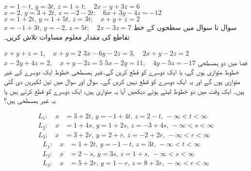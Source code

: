 $x=1-t,\,y=3t,\,z=1+t;\quad 2x-y+3z=6$
$x=2,\,y=3+2t,\,z=-2-2t;\quad 6x+3y-4z=-12$
$x=1+2t,\, y=1+5t,\,z=3t;\quad x+y+z=2$
$x=-1+3t,\,y=-2,\,z=5t;\quad 2x-3z=7$
سوال  تا سوال  میں سطحوں کے خط تقاطع کی مقدار معلوم مساوات تلاش کریں۔

$x+y+z=1,\quad x+y=2$
$3x-6y-2z=3,\quad 2x+y-2z=2$
$x-2y+4z=2,\quad x+y-2z=5$
$5x-2y=11,\quad 4y-5z=-17$
فضا میں  دو ہمسطحی   خطوط متوازی ہوں گے،  یا  ایک دوسرے کو قطع کریں گے۔غیر ہمسطحی خطوط ایک دوسرے کے غیر متوازی ہوں گے اور یہ ایک دوسرے کو قطع نہیں کریں گے۔ سوال  اور سوال  میں تین لکیریں  دی گئی ہیں۔  ایک وقت میں دو خطوط  لیتے ہوئے دیکھیں آیا یہ متوازی ہیں،   ایک دوسرے کو قطع کرتے ہیں یا یہ غیر ہمسطحی ہیں؟

\begin{align*}
L_1:\quad x&=3+2t,\,y=-1+4t,\,z=2-t,\,-\infty<t<\infty\\
L_2:\quad x&=1+4s,\,y=1+2s,\,z=-3+4s,\,-\infty<s<\infty\\
L_3:\quad x&=3+2r,\, y=2+r,\,z=-2+2r,\,-\infty<r<\infty
\end{align*}
\begin{align*}
L_1:\quad x&=1+2t,\,y=-1-t,\,z=3t,\,-\infty<t<\infty\\
L_2:\quad x&=2-s,\,y=3s,\,z=1+s,\,-\infty<s<\infty\\
L_3:\quad x&=5+2r,\,y=1-r,\,z=8+3r,\,-\infty<r<\infty
\end{align*}

